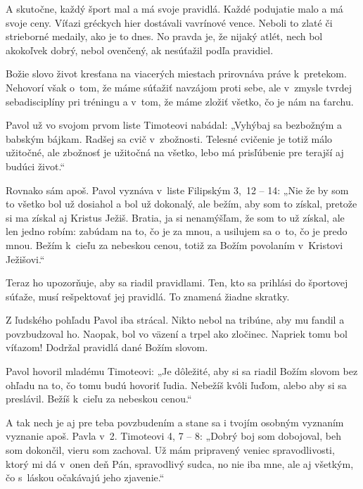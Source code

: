 A skutočne, každý šport mal a má svoje pravidlá. Každé podujatie malo a má svoje ceny. Víťazi gréckych hier dostávali vavrínové vence. Neboli to zlaté či strieborné medaily, ako je to dnes. No pravda je, že nijaký atlét, nech bol akokoľvek dobrý, nebol ovenčený, ak nesúťažil podľa pravidiel.

Božie slovo život kresťana na viacerých miestach prirovnáva práve k~pretekom. Nehovorí však o~tom, že máme súťažiť navzájom proti sebe, ale v~zmysle tvrdej sebadisciplíny pri tréningu a v~tom, že máme zložiť všetko, čo je nám na ťarchu.

Pavol už vo svojom prvom liste Timoteovi nabádal: „Vyhýbaj sa bezbožným a babským bájkam. Radšej sa cvič v~zbožnosti. Telesné cvičenie je totiž málo užitočné, ale zbožnosť je užitočná na všetko, lebo má prisľúbenie pre terajší aj budúci život.“

Rovnako sám apoš. Pavol vyznáva v~liste Filipským 3,~12 -- 14: „Nie že by som to všetko bol už dosiahol a bol už dokonalý, ale bežím, aby som to získal, pretože si ma získal aj Kristus Ježiš. Bratia, ja si nenamýšľam, že som to už získal, ale len jedno robím: zabúdam na to, čo je za mnou, a usilujem sa o~to, čo je predo mnou. Bežím k~cieľu za nebeskou cenou, totiž za Božím povolaním v~Kristovi Ježišovi.“

Teraz ho upozorňuje, aby sa riadil pravidlami. Ten, kto sa prihlási do športovej súťaže, musí rešpektovať jej pravidlá. To znamená žiadne skratky.

Z ľudského pohľadu Pavol iba strácal. Nikto nebol na tribúne, aby mu fandil a povzbudzoval ho. Naopak, bol vo väzení a trpel ako zločinec. Napriek tomu bol víťazom! Dodržal pravidlá dané Božím slovom.

Pavol hovoril mladému Timoteovi: „Je dôležité, aby si sa riadil Božím slovom bez ohľadu na to, čo tomu budú hovoriť ľudia. Nebežíš kvôli ľuďom, alebo aby si sa preslávil. Bežíš k~cieľu za nebeskou cenou.“

A tak nech je aj pre teba povzbudením a stane sa i tvojím osobným vyznaním vyznanie apoš. Pavla v~2. Timoteovi 4, 7 -- 8: „Dobrý boj som dobojoval, beh som dokončil, vieru som zachoval. Už mám pripravený veniec spravodlivosti, ktorý mi dá v~onen deň Pán, spravodlivý sudca, no nie iba mne, ale aj všetkým, čo s~láskou očakávajú jeho zjavenie.“



